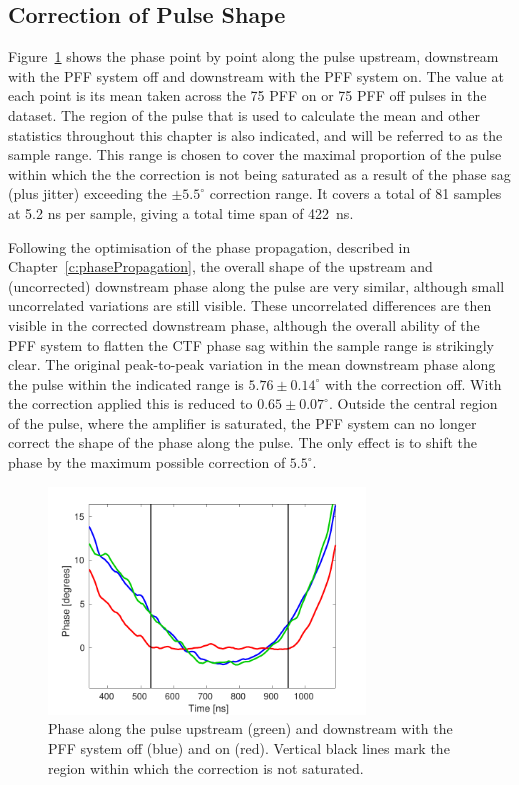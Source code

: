 \subsection{Correction of Pulse Shape}
\label{ss:bestPulseShape}

Figure~\ref{f:BestFF_MeanPhaseAlong} shows the phase point by point along the pulse upstream, downstream with the PFF system off and downstream with the PFF system on. The value at each point is its mean taken across the 75 PFF on or 75 PFF off pulses in the dataset. The region of the pulse that is used to calculate the mean and other statistics throughout this chapter is also indicated, and will be referred to as the sample range. This range is chosen to cover the maximal proportion of the pulse within which the the correction is not being saturated as a result of the phase sag (plus jitter) exceeding the \(\pm5.5^\circ\) correction range. It covers a total of 81 samples at 5.2 ns per sample, giving a total time span of 422~ns. %

Following the optimisation of the phase propagation, described in Chapter~\ref{c:phasePropagation}, the overall shape of the upstream and (uncorrected) downstream phase along the pulse are very similar, although small uncorrelated variations are still visible. These uncorrelated differences are then visible in the corrected downstream phase, although the overall ability of the PFF system to flatten the CTF phase sag within the sample range is strikingly clear. The original peak-to-peak variation in the mean downstream phase along the pulse within the indicated range is \(5.76\pm0.14^\circ\) with the correction off. With the correction applied this is reduced to \(0.65\pm0.07^\circ\). Outside the central region of the pulse, where the amplifier is saturated, the PFF system can no longer correct the shape of the phase along the pulse. The only effect is to shift the phase by the maximum possible correction of \(5.5^\circ\).

\begin{figure}
  \centering
  \includegraphics[width=0.75\textwidth]{Figures/feedforward/BestFF_MeanPhaseAlong}
  \caption{Phase along the pulse upstream (green) and downstream with the PFF system off (blue) and on (red). Vertical black lines mark the region within which the correction is not saturated.}
  \label{f:BestFF_MeanPhaseAlong}
\end{figure}

